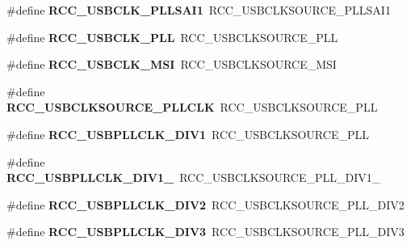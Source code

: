 \begin{DoxyCompactItemize}
\#define {\bfseries R\+C\+C\+\_\+\+U\+S\+B\+C\+L\+K\+\_\+\+P\+L\+L\+S\+A\+I1}~R\+C\+C\+\_\+\+U\+S\+B\+C\+L\+K\+S\+O\+U\+R\+C\+E\+\_\+\+P\+L\+L\+S\+A\+I1
\item 
\mbox{\label{group___h_a_l___r_c_c___aliased_ga422c36ab3f01cba07d36c501bf230363}} 
\#define {\bfseries R\+C\+C\+\_\+\+U\+S\+B\+C\+L\+K\+\_\+\+P\+LL}~R\+C\+C\+\_\+\+U\+S\+B\+C\+L\+K\+S\+O\+U\+R\+C\+E\+\_\+\+P\+LL
\item 
\mbox{\label{group___h_a_l___r_c_c___aliased_gab654f9e79c98d6d8edd733ad9606e98f}} 
\#define {\bfseries R\+C\+C\+\_\+\+U\+S\+B\+C\+L\+K\+\_\+\+M\+SI}~R\+C\+C\+\_\+\+U\+S\+B\+C\+L\+K\+S\+O\+U\+R\+C\+E\+\_\+\+M\+SI
\item 
\mbox{\label{group___h_a_l___r_c_c___aliased_ga5e2534f64b47ffdfe41dd2ced073389f}} 
\#define {\bfseries R\+C\+C\+\_\+\+U\+S\+B\+C\+L\+K\+S\+O\+U\+R\+C\+E\+\_\+\+P\+L\+L\+C\+LK}~R\+C\+C\+\_\+\+U\+S\+B\+C\+L\+K\+S\+O\+U\+R\+C\+E\+\_\+\+P\+LL
\item 
\mbox{\label{group___h_a_l___r_c_c___aliased_ga7bc98d6b5187339ea08d38e635b52788}} 
\#define {\bfseries R\+C\+C\+\_\+\+U\+S\+B\+P\+L\+L\+C\+L\+K\+\_\+\+D\+I\+V1}~R\+C\+C\+\_\+\+U\+S\+B\+C\+L\+K\+S\+O\+U\+R\+C\+E\+\_\+\+P\+LL
\item 
\mbox{\label{group___h_a_l___r_c_c___aliased_ga5ce8367d15851ff6055cffc9c31ce174}} 
\#define {\bfseries R\+C\+C\+\_\+\+U\+S\+B\+P\+L\+L\+C\+L\+K\+\_\+\+D\+I\+V1\+\_}~R\+C\+C\+\_\+\+U\+S\+B\+C\+L\+K\+S\+O\+U\+R\+C\+E\+\_\+\+P\+L\+L\+\_\+\+D\+I\+V1\+\_
\item 
\mbox{\label{group___h_a_l___r_c_c___aliased_gabe13349c49b3ef0401d97c2b748ffe7b}} 
\#define {\bfseries R\+C\+C\+\_\+\+U\+S\+B\+P\+L\+L\+C\+L\+K\+\_\+\+D\+I\+V2}~R\+C\+C\+\_\+\+U\+S\+B\+C\+L\+K\+S\+O\+U\+R\+C\+E\+\_\+\+P\+L\+L\+\_\+\+D\+I\+V2
\item 
\mbox{\label{group___h_a_l___r_c_c___aliased_ga895e6eac56d6689996989b9417c9ad62}} 
\#define {\bfseries R\+C\+C\+\_\+\+U\+S\+B\+P\+L\+L\+C\+L\+K\+\_\+\+D\+I\+V3}~R\+C\+C\+\_\+\+U\+S\+B\+C\+L\+K\+S\+O\+U\+R\+C\+E\+\_\+\+P\+L\+L\+\_\+\+D\+I\+V3

\end{DoxyCompactItemize}

